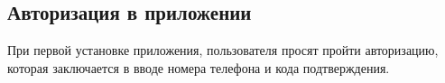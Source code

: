 \subsection{Авторизация в приложении}
\label{sec:usage:auth}

При первой установке приложения, пользователя просят пройти авторизацию, которая заключается в вводе номера телефона и кода подтверждения.

